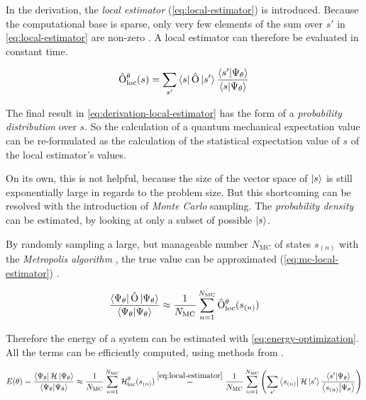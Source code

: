 In the derivation, the \emph{local estimator} (\autoref{eq:local-estimator}) is introduced. Because the computational base is sparse, only very few elements of the sum over $s'$ in \autoref{eq:local-estimator} are non-zero \cite{jVMCPaper}. A local estimator can therefore be evaluated in constant time.

\begin{equation}
    \label{eq:local-estimator}
    \hat{\mathrm{O}}_\mathrm{loc}^\theta(s) = \sum\limits_{s'} \bra{s} \hat{\mathrm{O}} \ket{s'} \frac{\bra{s'} \ket{\Psi_\theta}}{\bra{s} \ket{\Psi_\theta}}
\end{equation}

The final result in \autoref{eq:derivation-local-estimator} has the form of a \emph{probability distribution} over $s$.
So the calculation of a quantum mechanical expectation value can be re-formulated as the calculation of the statistical expectation value of $s$ of the local estimator's values.

On its own, this is not helpful, because the size of the vector space of $\ket{s}$ is still exponentially large in regards to the problem size.
But this shortcoming can be resolved with the introduction of \emph{Monte Carlo} sampling.
The \emph{probability density} can be estimated, by looking at only a subset of possible $\ket{s}$.

By randomly sampling a large, but manageable number $N_\mathrm{MC}$ of states $s_{(n)}$ with the \emph{Metropolis algorithm} \cite{quantumMonteCarloSimulationsOfSolids}, the true value can be approximated (\autoref{eq:mc-local-estimator}) \cite{jVMCPaper}.

\begin{equation}
    \label{eq:mc-local-estimator}
    \frac{\bra{\Psi_\theta}\hat{\mathrm{O}}\ket{\Psi_\theta}}{\bra{\Psi_\theta}\ket{\Psi_\theta}} \approx
    \frac{1}{N_\mathrm{MC}} \sum\limits_{n=1}^{N_\mathrm{MC}} \hat{\mathrm{O}}_\mathrm{loc}^\theta(s_{(n)})
\end{equation}

Therefore the energy of a system can be estimated with \autoref{eq:energy-optimization}. All the terms can be efficiently computed, using methods from .

\begin{equation}
    \label{eq:energy-optimization}
    E(\theta) = \frac{\bra{\Psi_\theta}\mathcal{H}\ket{\Psi_\theta}}{\bra{\Psi_\theta}\ket{\Psi_\theta}} \approx
    \frac{1}{N_\mathrm{MC}} \sum\limits_{n=1}^{N_\mathrm{MC}} \mathcal{H}_\mathrm{loc}^\theta(s_{(n)}) \stackrel{\ref{eq:local-estimator}}{=}
    \frac{1}{N_\mathrm{MC}} \sum\limits_{n=1}^{N_\mathrm{MC}} \left(\sum\limits_{s'} \bra{s_{(n)}} \mathcal{H} \ket{s'} \frac{\bra{s'} \ket{\Psi_\theta}}{\bra{s_{(n)}} \ket{\Psi_\theta}}\right)
\end{equation}

